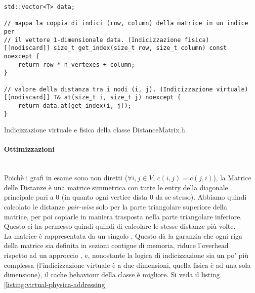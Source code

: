 \begin{listing}[!ht]
\begin{verbatim}
std::vector<T> data;

// mappa la coppia di indici (row, column) della matrice in un indice per
// il vettore 1-dimensionale data. (Indicizzazione fisica)
[[nodiscard]] size_t get_index(size_t row, size_t column) const noexcept {
    return row * n_vertexes + column;
}

// valore della distanza tra i nodi (i, j). (Indicizzazione virtuale)
[[nodiscard]] T& at(size_t i, size_t j) noexcept {
    return data.at(get_index(i, j));
}
\end{verbatim}
\caption{Indicizzazione virtuale e fisica della classe DistanceMatrix.h.}
\label{listing:virtual-physica-addressing}
\end{listing}

\paragraph{Ottimizzazioni}\mbox{} \\

\noindent Poichè i grafi in esame sono non diretti ($\forall i,j \in V$, $c(i,j) = c(j,i)$), la Matrice delle Distanze è una matrice simmetrica con tutte le entry della diagonale principale pari a 0 (in quanto ogni vertice dista 0 da se stesso).
Abbiamo quindi calcolato le distanze \textit{pair-wise} solo per la parte triangolare superiore della matrice, per poi copiarle in maniera trasposta nella parte triangolare inferiore. Questo ci ha permesso quindi quindi di calcolare le stesse distanze più volte. \\

\noindent La matrice è rappresentata da un singolo . Questo dà la garanzia che ogni riga della matrice sia definita in sezioni contigue di memoria, riduce l'overhead rispetto ad un approccio , e, nonostante la logica di indicizzazione sia un po' più complessa (l'indicizzazione virtuale è a due dimensioni, quella fisica è ad una sola dimensione), il cache behaviour della classe è migliore. Si veda il listing \ref{listing:virtual-physica-addressing}.

